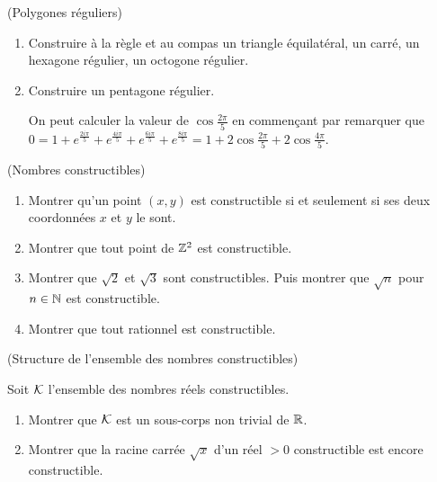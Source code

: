 \documentclass[a4paper,11pt,reqno]{amsart}
\begin{document}
\begin{exo}  (Polygones réguliers)

  \begin{enumerate}
    \item Construire à la règle et au compas un triangle équilatéral, un carré, un hexagone régulier, un octogone régulier.
    \item Construire un pentagone régulier.\\
    \begin{indication}
      On peut calculer la valeur de $\cos \frac{2\pi}{5}$ en commençant par remarquer que $0=1+e^{\frac{2i\pi}{5}}+e^{\frac{4i\pi}{5}}+e^{\frac{6i\pi}{5}}+e^{\frac{8i\pi}{5}}=1+2\cos\frac{2\pi}{5}+2\cos\frac{4\pi}{5}$.
    \end{indication}
  \end{enumerate}
\end{exo}


\begin{exo} (Nombres constructibles)

  \begin{enumerate}
    \item Montrer qu'un point $(x,y)$ est constructible si et seulement si ses deux coordonnées $x$ et $y$ le sont.
    \item Montrer que tout point de $\mathbb{Z}^2$ est constructible.
    \item Montrer que $\sqrt{2}$ et $\sqrt{3}$ sont constructibles. Puis montrer que $\sqrt{n}$ pour $n \in \mathbb{N}$ est constructible.
    \item Montrer que tout rationnel est constructible.
  \end{enumerate}
\end{exo}


\begin{exo}  (Structure de l'ensemble des nombres constructibles)

  Soit $\mathcal K$ l'ensemble  des nombres réels constructibles.
  \begin{enumerate}
    \item Montrer que $\mathcal K$ est un sous-corps non trivial de $\mathbb{R}$.
    \item Montrer que la racine carrée $\sqrt{x}$ d'un réel $>0$ constructible est encore constructible.
  \end{enumerate}
\end{exo}
\end{document}
